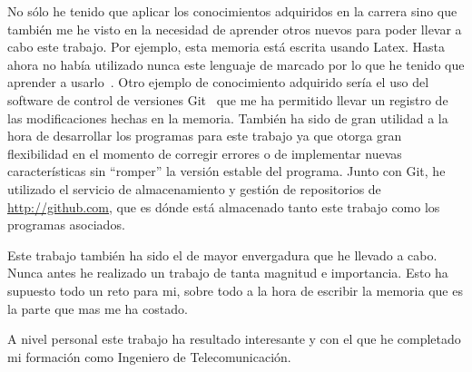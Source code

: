 
No sólo he tenido que aplicar los conocimientos adquiridos en la carrera sino que también me he visto en la necesidad de aprender otros nuevos para poder llevar a cabo este trabajo. Por ejemplo, esta memoria está escrita usando Latex. Hasta ahora no había utilizado nunca este lenguaje de marcado por lo que he tenido que aprender a usarlo~\cite{website:latex-wikibooks}. Otro ejemplo de conocimiento adquirido sería el uso del software de control de versiones Git~\cite{git} que me ha permitido llevar un registro de las modificaciones hechas en la memoria. También ha sido de gran utilidad a la hora de desarrollar los programas para este trabajo ya que otorga gran flexibilidad en el momento de corregir errores o de implementar nuevas características sin “romper” la versión estable del programa. Junto con Git, he utilizado el servicio de almacenamiento y gestión de repositorios de \url{http://github.com}, que es dónde está almacenado tanto este trabajo como los programas asociados.

Este trabajo también ha sido el de mayor envergadura que he llevado a cabo. Nunca antes he realizado un trabajo de tanta magnitud e importancia. Esto ha supuesto todo un reto para mi, sobre todo a la hora de escribir la memoria que es la parte que mas me ha costado.

A nivel personal este trabajo ha resultado interesante y con el que he completado mi formación como Ingeniero de Telecomunicación.
